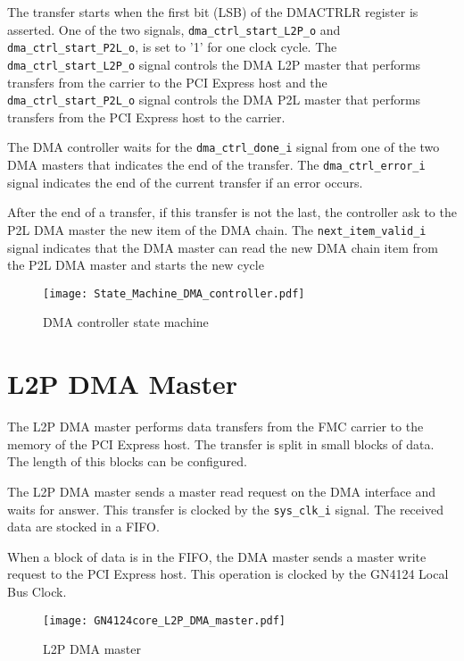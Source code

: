 \documentclass[10pt,a4paper]{cerndoc}
\begin{document}
The transfer starts when the first bit (LSB) of the DMACTRLR register is asserted. One of the two signals, \verb+dma_ctrl_start_L2P_o+ and \verb+dma_ctrl_start_P2L_o+, is set to '1' for one clock cycle. The \verb+dma_ctrl_start_L2P_o+ signal controls the DMA L2P master that performs transfers from the carrier to the PCI Express host and the \verb+dma_ctrl_start_P2L_o+ signal controls the DMA P2L master that performs transfers from the PCI Express host to the carrier.

The DMA controller waits for the \verb+dma_ctrl_done_i+ signal from one of the two DMA masters that indicates the end of the transfer. The \verb+dma_ctrl_error_i+ signal indicates the end of the current transfer if an error occurs.

After the end of a transfer, if this transfer is not the last, the controller ask to the P2L DMA master the new item of the DMA chain. The \verb+next_item_valid_i+ signal indicates that the DMA master can read the new DMA chain item from the P2L DMA master and starts the new cycle


\begin{figure}[!ht]
	\centering
		\texttt{[image: State\_Machine\_DMA\_controller.pdf]}
	\caption{DMA controller state machine}
	\label{fig:GN4124core_dma_ctrl_state_machine}
\end{figure}

  \section{L2P DMA Master}
The L2P DMA master performs data transfers from the FMC carrier to the memory of the PCI Express host. The transfer is split in small blocks of data. The length of this blocks can be configured.

The L2P DMA master sends a master read request on the DMA interface and waits for answer. This transfer is clocked by the \verb+sys_clk_i+ signal. The received data are stocked in a FIFO. 

When a block of data is in the FIFO, the DMA master sends a master write request to the PCI Express host. This operation is clocked by the GN4124 Local Bus Clock.
  

\begin{figure}[!ht]
	\centering
		\texttt{[image: GN4124core\_L2P\_DMA\_master.pdf]}
	\caption{L2P DMA master}
	\label{fig:GN4124core_l2p_dma_master}
\end{figure}
\end{document}
